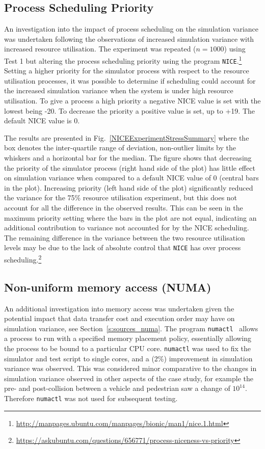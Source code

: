\subsection{Process Scheduling Priority} \label{r:process_scheduling}


An investigation into the impact of process scheduling on the simulation variance was undertaken following the observations of increased simulation variance with increased resource utilisation. The experiment was repeated ($n=1000$) using Test 1 but altering the process scheduling priority using the program \texttt{NICE}.\footnote{\url{http://manpages.ubuntu.com/manpages/bionic/man1/nice.1.html}} Setting a higher priority for the simulator process with respect to the resource utilisation processes, it was possible to determine if scheduling could account for the increased simulation variance when the system is under high resource utilisation.
%
To give a process a high priority a negative NICE value is set with the lowest being -20. To decrease the priority a positive value is set, up to +19. The default NICE value is 0.

The results are presented in Fig.~\ref{NICEExperimentStressSummary} where the box denotes the inter-quartile range of deviation, non-outlier limits by the whiskers and a horizontal bar for the median. The figure shows that decreasing the priority of the simulator process (right hand side of the  plot) has little effect on simulation variance when compared to a default NICE value of 0 (central bars in the plot). Increasing priority (left hand side of the plot) significantly reduced the variance for the 75\% resource utilisation experiment, but this does not account for all the difference in the observed results. This can be seen in the maximum priority setting where the bars in the plot are not equal, indicating an additional contribution to variance not accounted for by the NICE scheduling. 
%
The remaining difference in the variance between the two resource utilisation levels may be due to the lack of absolute control that \texttt{NICE} has over process scheduling.\footnote{\url{https://askubuntu.com/questions/656771/process-niceness-vs-priority}}

\subsection{Non-uniform memory access (NUMA)} \label{r:numa}
An additional investigation into memory access was undertaken given the potential impact that data transfer cost and execution order may have on simulation variance, see Section~\ref{s:sources_numa}. %
The program \texttt{numactl}~\cite{numactl_NUMA} allows a process to run with a specified memory placement policy, essentially allowing the process to be bound to a particular CPU core. %
\texttt{numactl} was used to fix the simulator and test script to single cores, and a (2\%) improvement in simulation variance was observed. %
This was considered minor comparative to the changes in simulation variance observed in other aspects of the case study, for example the pre- and post-collision between a vehicle and pedestrian saw a change of $10^{14}$. Therefore \texttt{numactl} was not used for subsequent testing.

